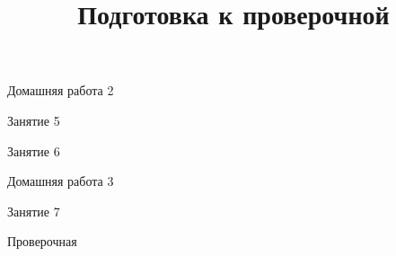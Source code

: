 \begin{homework}[number=2]
	\begin{listofex}
		\item Домашняя работа 2
	\end{listofex}
\end{homework}

\begin{class}[number=5]
	\begin{listofex}
		\item Занятие 5
	\end{listofex}
\end{class}

\begin{class}[number=6]
	\begin{listofex}
		\item Занятие 6
	\end{listofex}
\end{class}

\begin{homework}[number=3]
	\begin{listofex}
		\item Домашняя работа 3
	\end{listofex}
\end{homework}

\begin{class}[number=7]
	\title{Подготовка к проверочной}
	\begin{listofex}
		\item Занятие 7
	\end{listofex}
\end{class}

\begin{exam}
	\begin{listofex}
		\item Проверочная
	\end{listofex}
\end{exam}
